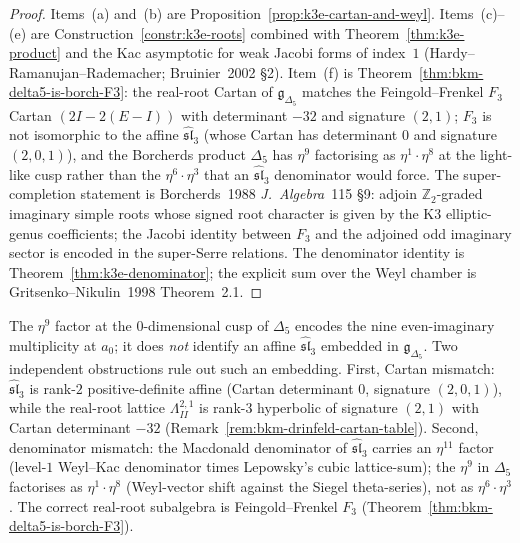 \begin{proof}
Items~(a) and~(b) are Proposition~\ref{prop:k3e-cartan-and-weyl}. Items~(c)--(e) are Construction~\ref{constr:k3e-roots} combined with Theorem~\ref{thm:k3e-product} and the Kac asymptotic for weak Jacobi forms of index~$1$ (Hardy--Ramanujan--Rademacher; Bruinier~2002 \S2). Item~(f) is Theorem~\ref{thm:bkm-delta5-is-borch-F3}: the real-root Cartan of $\mathfrak{g}_{\Delta_5}$ matches the Feingold--Frenkel $F_3$ Cartan $(2 I - 2(E - I))$ with determinant $-32$ and signature $(2, 1)$; $F_3$ is not isomorphic to the affine $\widehat{\mathfrak{sl}}_3$ (whose Cartan has determinant $0$ and signature $(2, 0, 1)$), and the Borcherds product $\Delta_5$ has $\eta^9$ factorising as $\eta^1 \cdot \eta^8$ at the light-like cusp rather than the $\eta^6 \cdot \eta^3$ that an $\widehat{\mathfrak{sl}}_3$ denominator would force. The super-completion statement is Borcherds~1988 \emph{J.\ Algebra}~115 \S9: adjoin $\mathbb{Z}_2$-graded imaginary simple roots whose signed root character is given by the K3 elliptic-genus coefficients; the Jacobi identity between $F_3$ and the adjoined odd imaginary sector is encoded in the super-Serre relations. The denominator identity is Theorem~\ref{thm:k3e-denominator}; the explicit sum over the Weyl chamber is Gritsenko--Nikulin~1998 Theorem~2.1.
\end{proof}

\begin{remark}
\label{rem:k3e-platonic-sl3-separation}
The $\eta^9$ factor at the $0$-dimensional cusp of $\Delta_5$ encodes the nine even-imaginary multiplicity at $a_0$; it does \emph{not} identify an affine $\widehat{\mathfrak{sl}}_3$ embedded in $\mathfrak{g}_{\Delta_5}$. Two independent obstructions rule out such an embedding. First, Cartan mismatch: $\widehat{\mathfrak{sl}}_3$ is rank-$2$ positive-definite affine (Cartan determinant $0$, signature $(2, 0, 1)$), while the real-root lattice $\Lambda^{2,1}_{II}$ is rank-$3$ hyperbolic of signature $(2, 1)$ with Cartan determinant $-32$ (Remark~\ref{rem:bkm-drinfeld-cartan-table}). Second, denominator mismatch: the Macdonald denominator of $\widehat{\mathfrak{sl}}_3$ carries an $\eta^{11}$ factor (level-$1$ Weyl--Kac denominator times Lepowsky's cubic lattice-sum); the $\eta^9$ in $\Delta_5$ factorises as $\eta^1 \cdot \eta^8$ (Weyl-vector shift against the Siegel theta-series), not as $\eta^6 \cdot \eta^3$. The correct real-root subalgebra is Feingold--Frenkel $F_3$ (Theorem~\ref{thm:bkm-delta5-is-borch-F3}).
\end{remark}


